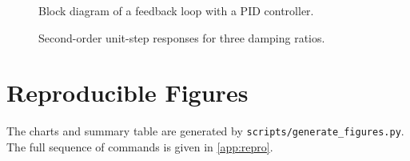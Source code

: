 \begin{figure}[htbp]
  \centering
  \resizebox{\textwidth}{!}{}
  \caption{Block diagram of a feedback loop with a PID controller.}
  \label{fig:loop-thesis}
\end{figure}

\begin{figure}[htbp]
  \centering
  
  \caption{Second-order unit-step responses for three damping ratios.}
  \label{fig:step-thesis}
\end{figure}

\section{Reproducible Figures}
The charts and summary table are generated by \texttt{scripts/generate\_figures.py}. The full sequence of commands is given in \cref{app:repro}.
